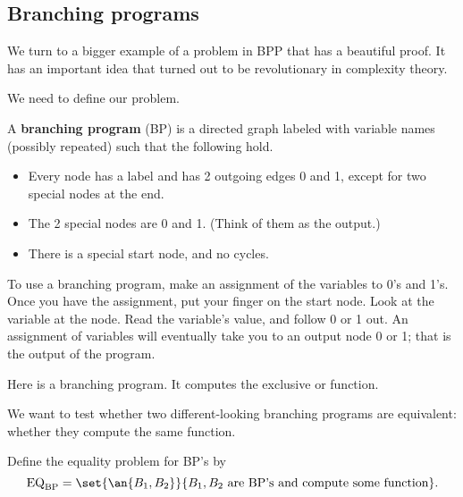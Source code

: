 \subsection{Branching programs}

We turn to a bigger example of a problem in BPP that has a beautiful proof. It has an important idea that turned out to be revolutionary in complexity theory.



We need to define our problem.  %

\begin{df}
A \textbf{branching program} (BP) is a directed graph labeled with variable names (possibly repeated) such that the following hold.
\begin{itemize}
\item
Every node has a label and has 2 outgoing edges 0 and 1, except for two special nodes at the end.
\item
The 2 special nodes are 0 and 1. (Think of them as the output.)
\item
There is a special start node, and no cycles.
\end{itemize}


To use a branching program, make an assignment of the variables to 0's and 1's. Once you have the assignment, put your finger on the start node. Look at the variable at the node. Read the variable's value, and follow 0 or 1 out. An assignment of variables will eventually take you to an output node 0 or 1; that is the output of the program.
\end{df}

Here is a branching program. It computes the exclusive or function. %


We want to test whether two different-looking branching programs are equivalent: whether they compute the same function.
\begin{df}
Define the equality problem for BP's by
\[
\text{EQ}_{\text{BP}}=\set{\an{B_1,B_2}}{B_1,B_2\text{ are BP's and compute some function}}.
\]
\end{df}

